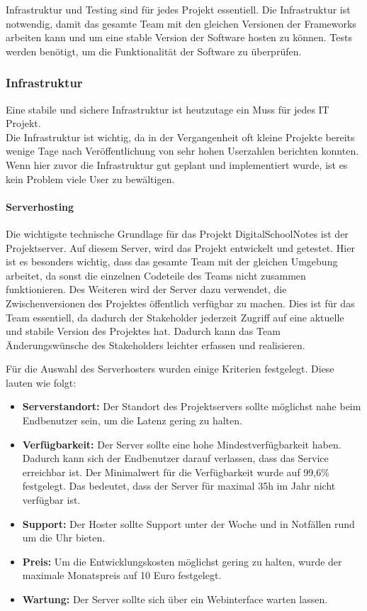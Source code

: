 
Infrastruktur und Testing sind für jedes Projekt essentiell. Die Infrastruktur ist notwendig, damit das gesamte Team mit den gleichen Versionen der Frameworks arbeiten kann und um eine stable Version der Software hosten zu können. Tests werden benötigt, um die Funktionalität der Software zu überprüfen.
\subsubsection{Infrastruktur}
Eine stabile und sichere Infrastruktur ist heutzutage ein Muss für jedes IT Projekt. \\
Die Infrastruktur ist wichtig, da in der Vergangenheit oft kleine Projekte bereits wenige Tage nach Veröffentlichung von sehr hohen Userzahlen berichten konnten. Wenn hier zuvor die Infrastruktur gut geplant und implementiert wurde, ist es kein Problem viele User zu bewältigen.
\paragraph{Serverhosting}
Die wichtigste technische Grundlage für das Projekt DigitalSchoolNotes ist der Projektserver. Auf diesem Server, wird das Projekt entwickelt und getestet. Hier ist es besonders wichtig, dass das gesamte Team mit der gleichen Umgebung arbeitet, da sonst die einzelnen Codeteile des Teams nicht zusammen funktionieren. Des Weiteren wird der Server dazu verwendet, die Zwischenversionen des Projektes öffentlich verfügbar zu machen. Dies ist für das Team essentiell, da dadurch der \gls{Stakeholder} jederzeit Zugriff auf eine aktuelle und stabile Version des Projektes hat. Dadurch kann das Team Änderungswünsche des Stakeholders leichter erfassen und realisieren.\\

\newpage

Für die Auswahl des Serverhosters wurden einige Kriterien festgelegt. Diese lauten wie folgt:
\begin{itemize}
\item \textbf{Serverstandort:} Der Standort des Projektservers sollte möglichst nahe beim Endbenutzer sein, um die \gls{Latenz} gering zu halten.
\item \textbf{Verfügbarkeit:} Der Server sollte eine hohe Mindestverfügbarkeit haben. Dadurch kann sich der Endbenutzer darauf verlassen, dass das Service erreichbar ist. Der Minimalwert für die Verfügbarkeit wurde auf 99,6\% festgelegt. Das bedeutet, dass der Server für maximal 35h im Jahr nicht verfügbar ist.
\item \textbf{Support:} Der Hoster sollte Support unter der Woche und in Notfällen rund um die Uhr bieten.
\item \textbf{Preis:} Um die Entwicklungskosten möglichst gering zu halten, wurde der maximale Monatspreis auf 10 Euro festgelegt.
\item \textbf{Wartung:} Der Server sollte sich über ein Webinterface warten lassen.
\end{itemize}

